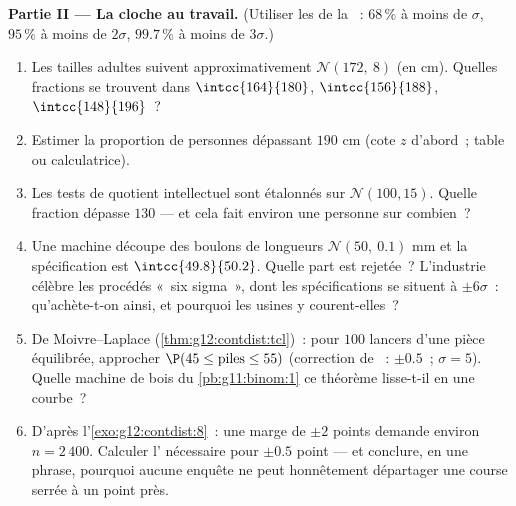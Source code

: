 \begin{problem}
\medskip
\noindent\textbf{Partie II --- La cloche au travail.}
(Utiliser les  de la ~: $68\,\%$ à moins de
$\sigma$, $95\,\%$ à moins de $2\sigma$, $99.7\,\%$ à moins de
$3\sigma$.)
\begin{enumerate}[resume]
  \item Les tailles adultes suivent approximativement
        $\mathcal N(172,\ 8)$ (en cm). Quelles fractions se
        trouvent dans $\intcc{164}{180}$, $\intcc{156}{188}$,
        $\intcc{148}{196}$~?
  \item Estimer la proportion de personnes dépassant $190$ cm (cote
        $z$ d'abord~; table ou calculatrice).
  \item Les tests de quotient intellectuel sont étalonnés sur
        $\mathcal N(100, 15)$. Quelle fraction dépasse $130$ --- et
        cela fait environ une personne sur combien~?
  \item Une machine découpe des boulons de longueurs
        $\mathcal N(50,\ 0.1)$ mm et la spécification est
        $\intcc{49.8}{50.2}$. Quelle part est rejetée~? L'industrie
        célèbre les procédés «~six sigma~», dont les spécifications
        se situent à $\pm 6\sigma$~: qu'achète-t-on ainsi, et
        pourquoi les usines y courent-elles~?
  \item De Moivre--Laplace (\cref{thm:g12:contdist:tcl})~: pour
        $100$ lancers d'une pièce équilibrée, approcher
        $\P(45 \leq \text{piles} \leq 55)$ (correction de
        ~: $\pm 0.5$~; $\sigma = 5$). Quelle machine de
        bois du \cref{pb:g11:binom:1} ce théorème lisse-t-il en une
        courbe~?
  \item D'après l'\cref{exo:g12:contdist:8}~: une marge de $\pm 2$
        points demande environ $n = 2\,400$. Calculer l'
        nécessaire pour $\pm 0.5$ point --- et conclure, en une
        phrase, pourquoi aucune enquête ne peut honnêtement
        départager une course serrée à un point près.
\end{enumerate}


\end{problem}
